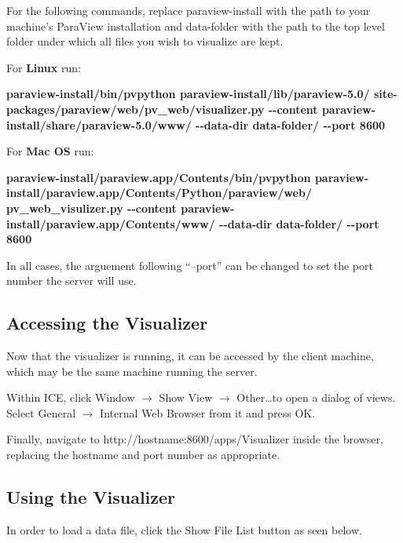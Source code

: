 For the following commands, replace paraview-install with the path to your
machine's ParaView installation and data-folder with the path to the top level
folder under which all files you wish to visualize are kept.

For \textbf{Linux} run:

\textbf{paraview-install/bin/pvpython
paraview-install/lib/paraview-5.0/\newline
site-packages/paraview/web/pv\_web/visualizer.py -{}-content
paraview-install/share/paraview-5.0/www/ -{}-data-dir data-folder/ -{}-port
8600}

For \textbf{Mac OS} run:
 
\textbf{paraview-install/paraview.app/Contents/bin/pvpython
paraview-install/paraview.app/Contents/Python/paraview/web/\newline
pv\_web\_visulizer.py -{}-content
paraview-install/paraview.app/\newline Contents/www/ -{}-data-dir data-folder/
-{}-port 8600}

In all cases, the arguement following ``--port'' can be changed to set the port
number the server will use.

\subsection{Accessing the Visualizer}

Now that the visualizer is running, it can be accessed by the client machine,
which may be the same machine running the server.

Within ICE, click Window $\rightarrow$ Show View $\rightarrow$ Other\ldots to
open a dialog of views. Select General $\rightarrow$ Internal Web Browser from
it and press OK.

Finally, navigate to http://hostname:8600/apps/Visualizer inside the browser,
replacing the hostname and port number as appropriate. 

\subsection{Using the Visualizer}

In order to load a data file, click the Show File List button as seen below.

